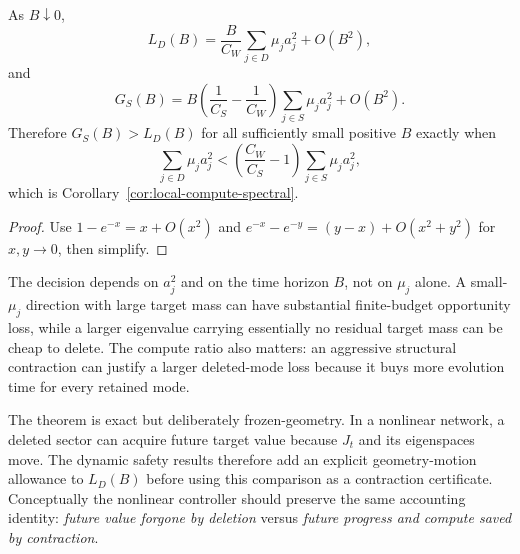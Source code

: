 \begin{corollary}\label{cor:fixed-to-local}
As $B\downarrow0$,
\[
L_D(B)
=
\frac{B}{C_W}\sum_{j\in D}\mu_ja_j^2+O(B^2),
\]
and
\[
G_S(B)
=
B\left(\frac1{C_S}-\frac1{C_W}\right)
\sum_{j\in S}\mu_ja_j^2+O(B^2).
\]
Therefore $G_S(B)>L_D(B)$ for all sufficiently small positive $B$ exactly when
\[
\sum_{j\in D}\mu_ja_j^2
<
\left(\frac{C_W}{C_S}-1\right)
\sum_{j\in S}\mu_ja_j^2,
\]
which is Corollary~\ref{cor:local-compute-spectral}.
\end{corollary}

\begin{proof}
Use $1-e^{-x}=x+O(x^2)$ and
$e^{-x}-e^{-y}=(y-x)+O(x^2+y^2)$ for $x,y\to0$, then simplify.
\end{proof}

\begin{remark}
The decision depends on $a_j^2$ and on the time horizon $B$, not on $\mu_j$ alone. A small-$\mu_j$ direction with large target mass can have substantial finite-budget opportunity loss, while a larger eigenvalue carrying essentially no residual target mass can be cheap to delete. The compute ratio also matters: an aggressive structural contraction can justify a larger deleted-mode loss because it buys more evolution time for every retained mode.
\end{remark}

\begin{remark}
The theorem is exact but deliberately frozen-geometry. In a nonlinear network, a deleted sector can acquire future target value because $J_t$ and its eigenspaces move. The dynamic safety results therefore add an explicit geometry-motion allowance to $L_D(B)$ before using this comparison as a contraction certificate. Conceptually the nonlinear controller should preserve the same accounting identity: \emph{future value forgone by deletion} versus \emph{future progress and compute saved by contraction}.
\end{remark}
